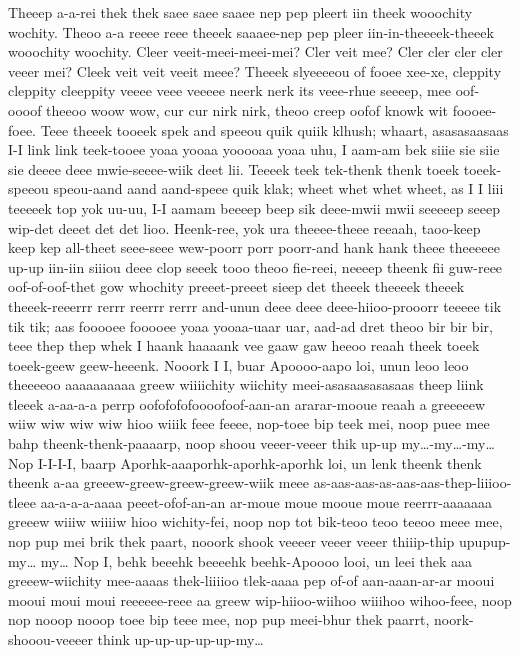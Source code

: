 \documentclass[12pt,a4paper]{article}
\begin{document}
\begin{drama}
Theeep a-a-rei thek thek saee saee saaee nep pep pleert iin theek wooochity wochity. Theoo a-a reeee reee theeek saaaee-nep pep pleer iin-in-theeeek-theeek wooochity woochity.
\chorspeaks
Cleer veeit-meei-meei-mei? Cler veit mee? Cler cler cler cler veeer mei? Cleek veit veit veeit meee?
\epopspeaks
Theeek slyeeeeou of fooee xee-xe, cleppity cleppity cleeppity veeee veee veeeee neerk nerk its veee-rhue seeeep, mee oof-oooof theeoo woow wow, cur cur nirk nirk, theoo creep oofof knowk wit foooee-foee.
\chorspeaks
Teee theeek tooeek spek and speeou quik quiik klhush; whaart, asasasaasaas I-I link link teek-tooee yoaa yooaa yooooaa yoaa uhu, I aam-am bek siiie sie siie sie deeee deee mwie-seeee-wiik deet lii. Teeeek teek tek-thenk thenk toeek toeek-speeou speou-aand aand aand-speee quik klak; wheet whet whet wheet, as I I liii teeeeek top yok uu-uu, I-I aamam beeeep beep sik deee-mwii mwii seeeeep seeep wip-det deeet det det lioo.
\epopspeaks
Heenk-ree, yok ura theeee-theee reeaah, taoo-keep keep kep all-theet seee-seee wew-poorr porr poorr-and hank hank theee theeeeee up-up iin-iin siiiou deee clop seeek tooo theoo fie-reei, neeeep theenk fii guw-reee oof-of-oof-thet gow whochity preeet-preeet sieep det theeek theeeek theeek theeek-reeerrr rerrr reerrr rerrr and-unun deee deee deee-hiioo-prooorr teeeee tik tik tik; aas fooooee fooooee yoaa yooaa-uaar uar, aad-ad dret theoo bir bir bir, teee thep thep whek I haank haaaank vee gaaw gaw heeoo reaah theek toeek toeek-geew geew-heeenk.
\pistspeaks
Nooork I I, buar Apoooo-aapo loi, unun leoo leoo theeeeoo aaaaaaaaaa greew wiiiichity wiichity meei-asasaasasasaas theep liink tleeek a-aa-a-a perrp oofofofofoooofoof-aan-an ararar-mooue reaah a greeeeew wiiw wiw wiw wiw hioo wiiik feee feeee, nop-toee bip teek mei, noop puee mee bahp theenk-thenk-paaaarp, noop shoou veeer-veeer thik up-up my…-my…-my… Nop I-I-I-I, baarp Aporhk-aaaporhk-aporhk-aporhk loi, un lenk theenk thenk theenk a-aa greeew-greew-greew-greew-wiik meee as-aas-aas-as-aas-aas-thep-liiioo-tleee aa-a-a-a-aaaa peeet-ofof-an-an ar-moue moue mooue moue reerrr-aaaaaaa greeew wiiiw wiiiiw hioo wichity-fei, noop nop tot bik-teoo teoo teeoo meee mee, nop pup mei brik thek paart, nooork shook veeeer veeer veeer thiiip-thip upupup-my… my… Nop I, behk beeehk beeeehk beehk-Apoooo looi, un leei thek aaa greeew-wiichity mee-aaaas thek-liiiioo tlek-aaaa pep of-of aan-aaan-ar-ar mooui mooui moui moui reeeeee-reee aa greew wip-hiioo-wiihoo wiiihoo wihoo-feee, noop nop nooop nooop toee bip teee mee, nop pup meei-bhur thek paarrt, noork-shooou-veeeer think up-up-up-up-up-my…

\end{drama}
\end{document}
